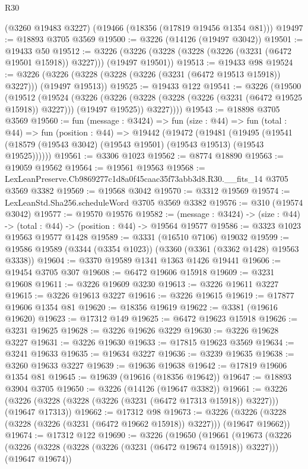 \begin{lexlean}{R30}
\begin{coremodule}
    (@3260 @19483 @3227)
    (@19466 (@18356 (@17819 @19456 @1354 @81)))
@19497 := @18893 @3705 @3569
@19500 := @3226 (@14126 (@19497 @3042))
@19501 := @19433 @50
@19512 := @3226 (@3226 (@3228 (@3228 (@3226 (@3231 (@6472 @19501 @15918)) @3227))) (@19497 @19501))
@19513 := @19433 @98
@19524 := @3226 (@3226 (@3228 (@3228 (@3226 (@3231 (@6472 @19513 @15918)) @3227))) (@19497 @19513))
@19525 := @19433 @122
@19541 := @3226
    (@19500
      (@19512
        (@19524
          (@3226
            (@3226 (@3228 (@3228 (@3226 (@3231 (@6472 @19525 @15918)) @3227))) (@19497 @19525))
            @3227))))
@19543 := @18898 @3705 @3569
@19560 := fun (message : @3424) =>
  fun (size : @44) =>
  fun (total : @44) =>
  fun (position : @44) =>
  @19442
    (@19472
      (@19481
        (@19495 (@19541 (@18579 (@19543 @3042) (@19543 @19501) (@19543 @19513) (@19543 @19525))))))
@19561 := @3306 @1023
@19562 := @8774 @18890
@19563 := @19059 @19562
@19564 := @19561 @19563
@19568 := LexLeanPreserve.Cb9869277c1d8a0f45caac35f73abb3d8.R30.__fits_14 @3705 @3569 @3382
@19569 := @19568 @3042
@19570 := @3312 @19569
@19574 := LexLeanStd.Sha256.scheduleWord @3705 @3569 @3382
@19576 := @310 (@19574 @3042)
@19577 := @19570 @19576
@19582 := (message : @3424) -> (size : @44) -> (total : @44) -> (position : @44) -> @19564 @19577
@19586 := @3323 @1023 @19563 @19577 @1428
@19589 := @3331 (@16510 @7106) @19032
@19599 := @19586 @19589 (@3344 (@3354 @1023)) (@3360 (@3361 (@3362 @1428) @19563 @3338))
@19604 := @3370 @19589 @1341 @1363 @1426 @19441
@19606 := @19454 @3705 @307
@19608 := @6472 @19606 @15918
@19609 := @3231 @19608
@19611 := @3226 @19609 @3230
@19613 := @3226 @19611 @3227
@19615 := @3226 @19613 @3227
@19616 := @3226 @19615
@19619 := @17877 @19606 @1354 @81
@19620 := @18356 @19619
@19622 := @3381 (@19616 @19620)
@19623 := @17312 @149
@19625 := @6472 @19623 @15918
@19626 := @3231 @19625
@19628 := @3226 @19626 @3229
@19630 := @3226 @19628 @3227
@19631 := @3226 @19630
@19633 := @17815 @19623 @3569
@19634 := @3241 @19633
@19635 := @19634 @3227
@19636 := @3239 @19635
@19638 := @3260 @19633 @3227
@19639 := @19636 @19638
@19642 := @17819 @19606 @1354 @81
@19645 := @19639 (@19616 (@18356 @19642))
@19647 := @18893 @3904 @3705
@19650 := @3226 (@14126 (@19647 @3382))
@19661 := @3226 (@3226 (@3228 (@3228 (@3226 (@3231 (@6472 @17313 @15918)) @3227))) (@19647 @17313))
@19662 := @17312 @98
@19673 := @3226 (@3226 (@3228 (@3228 (@3226 (@3231 (@6472 @19662 @15918)) @3227))) (@19647 @19662))
@19674 := @17312 @122
@19690 := @3226
    (@19650
      (@19661
        (@19673
          (@3226
            (@3226 (@3228 (@3228 (@3226 (@3231 (@6472 @19674 @15918)) @3227))) (@19647 @19674))

\end{coremodule}
\end{lexlean}
